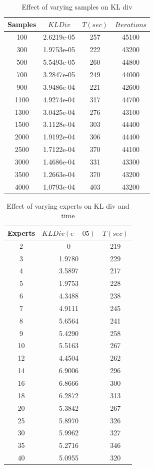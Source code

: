 \documentclass[10pt, conference, compsocconf]{IEEEtran}
\begin{document}
\begin{table}[htdp]
\begin{center}
\begin{tabular}{| c | c | c | c |}
\hline
Samples & $KL Div$ & $T(sec)$ & $Iterations$ \\
\hline
100 & 2.6219e-05 & 257 & 45100 \\
300 & 1.9753e-05 & 222 & 43200 \\
500 & 5.5493e-05 & 260 & 44800 \\
700 & 3.2847e-05 & 249 & 44000 \\
900 & 3.9486e-04 & 221 & 42600 \\
1100 & 4.9274e-04 & 317 & 44700 \\
1300 & 3.0425e-04 & 276 & 43100 \\
1500 &  3.1128e-04 & 303 & 44400\\
2000 & 1.9192e-04 & 306 & 44400\\
2500 & 1.7122e-04 & 370 & 44100 \\
3000 & 1.4686e-04 & 331 & 43300 \\
3500 & 1.2663e-04 & 370 & 43200 \\
4000 & 1.0793e-04 & 403 & 43200 \\
\hline
\end{tabular}
\end{center}
\caption{Effect of varying samples on KL div}
\label{table:data}
\end{table}

\begin{table}[htdp]
\begin{center}
\begin{tabular}{| c | c | c |}
\hline
Experts & $KL Div (e-05)$ & $T(sec)$\\
\hline
2 & 0 & 219 \\
3 & 1.9780 & 229 \\
4 & 3.5897 & 217 \\
5 & 1.9753 & 228 \\
6 & 4.3488 & 238 \\
7 & 4.9111 & 245  \\
8 & 5.6564 & 241 \\
9 & 5.4290 & 258 \\
10 & 5.5163 & 267 \\
12 & 4.4504 & 262 \\
14 & 6.9006 & 296 \\
16 & 6.8666 & 300 \\
18 & 6.2872 & 313 \\
20 & 5.3842 & 267 \\
25 & 5.8970 & 326 \\
30 & 5.9962 & 327  \\
35 & 5.2716 & 346 \\
40 & 5.0955 & 320 \\
\hline
\end{tabular}
\end{center}
\caption{Effect of varying experts on KL div and time}
\label{table:error}
\end{table}
\end{document}
